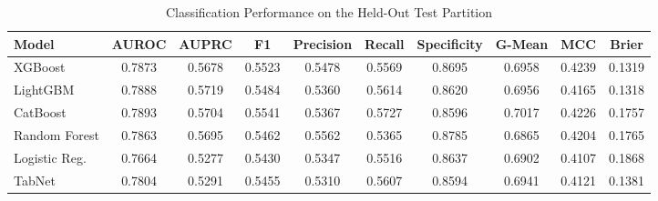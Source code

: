 \begin{table}
\centering
\caption{Classification Performance on the Held-Out Test Partition}
\label{tab:results}
\begin{tabular}{lccccccccc}
\toprule
Model & AUROC & AUPRC & F1 & Precision & Recall & Specificity & G-Mean & MCC & Brier \\
\midrule
XGBoost & 0.7873 & 0.5678 & 0.5523 & 0.5478 & 0.5569 & 0.8695 & 0.6958 & 0.4239 & 0.1319 \\
LightGBM & 0.7888 & 0.5719 & 0.5484 & 0.5360 & 0.5614 & 0.8620 & 0.6956 & 0.4165 & 0.1318 \\
CatBoost & 0.7893 & 0.5704 & 0.5541 & 0.5367 & 0.5727 & 0.8596 & 0.7017 & 0.4226 & 0.1757 \\
Random Forest & 0.7863 & 0.5695 & 0.5462 & 0.5562 & 0.5365 & 0.8785 & 0.6865 & 0.4204 & 0.1765 \\
Logistic Reg. & 0.7664 & 0.5277 & 0.5430 & 0.5347 & 0.5516 & 0.8637 & 0.6902 & 0.4107 & 0.1868 \\
TabNet & 0.7804 & 0.5291 & 0.5455 & 0.5310 & 0.5607 & 0.8594 & 0.6941 & 0.4121 & 0.1381 \\
\bottomrule
\end{tabular}
\end{table}
